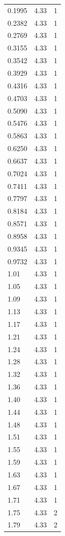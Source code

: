 \begin{longtable}{lrr}
  0.1995 & 4.33 & 1 \\
  0.2382 & 4.33 & 1 \\
  0.2769 & 4.33 & 1 \\
  0.3155 & 4.33 & 1 \\
  0.3542 & 4.33 & 1 \\
  0.3929 & 4.33 & 1 \\
  0.4316 & 4.33 & 1 \\
  0.4703 & 4.33 & 1 \\
  0.5090 & 4.33 & 1 \\
  0.5476 & 4.33 & 1 \\
  0.5863 & 4.33 & 1 \\
  0.6250 & 4.33 & 1 \\
  0.6637 & 4.33 & 1 \\
  0.7024 & 4.33 & 1 \\
  0.7411 & 4.33 & 1 \\
  0.7797 & 4.33 & 1 \\
  0.8184 & 4.33 & 1 \\
  0.8571 & 4.33 & 1 \\
  0.8958 & 4.33 & 1 \\
  0.9345 & 4.33 & 1 \\
  0.9732 & 4.33 & 1 \\
  1.01 & 4.33 & 1 \\
  1.05 & 4.33 & 1 \\
  1.09 & 4.33 & 1 \\
  1.13 & 4.33 & 1 \\
  1.17 & 4.33 & 1 \\
  1.21 & 4.33 & 1 \\
  1.24 & 4.33 & 1 \\
  1.28 & 4.33 & 1 \\
  1.32 & 4.33 & 1 \\
  1.36 & 4.33 & 1 \\
  1.40 & 4.33 & 1 \\
  1.44 & 4.33 & 1 \\
  1.48 & 4.33 & 1 \\
  1.51 & 4.33 & 1 \\
  1.55 & 4.33 & 1 \\
  1.59 & 4.33 & 1 \\
  1.63 & 4.33 & 1 \\
  1.67 & 4.33 & 1 \\
  1.71 & 4.33 & 1 \\
  1.75 & 4.33 & 2 \\
  1.79 & 4.33 & 2 \\

\end{longtable}
